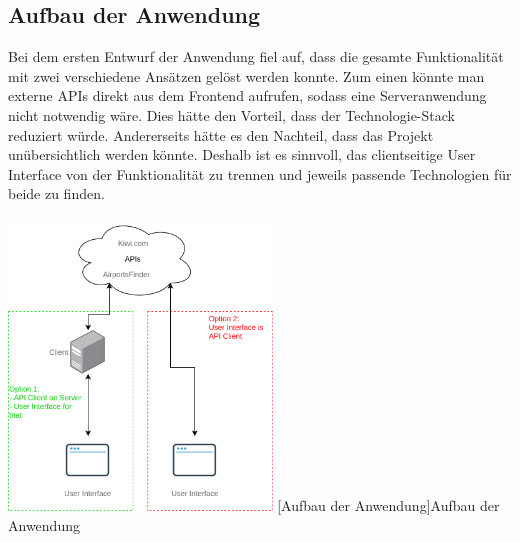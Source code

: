 \documentclass[12pt,twoside,a4paper]{article}
\begin{document}
\subsection{Aufbau der Anwendung}
Bei dem ersten Entwurf der Anwendung fiel auf, dass die gesamte Funktionalität mit zwei verschiedene Ansätzen gelöst werden konnte. Zum einen könnte man externe APIs direkt aus dem Frontend aufrufen, sodass eine Serveranwendung nicht notwendig wäre. Dies hätte den Vorteil, dass der Technologie-Stack reduziert würde. Andererseits hätte es den Nachteil, dass das Projekt unübersichtlich werden könnte. Deshalb ist es sinnvoll, das clientseitige User Interface von der Funktionalität zu trennen und jeweils passende Technologien für beide zu finden.
\begin{center}
	\captionsetup{type=figure}
	\includegraphics[width=7cm]{images/client-design}
	[Aufbau der Anwendung]{Aufbau der Anwendung}
\end{center}
\end{document}
